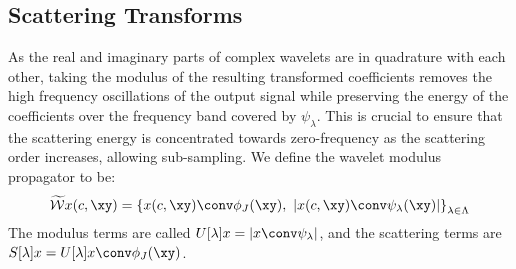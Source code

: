 \subsection{Scattering Transforms}\label{sec:ch5:scatter}
As the real and imaginary parts of complex wavelets are in quadrature with
each other, taking the modulus of the resulting transformed coefficients removes
the high frequency oscillations of the output signal while preserving the energy
of the coefficients over the frequency band covered by $\psi_\lambda$. This is
crucial to ensure that the scattering energy is concentrated towards
zero-frequency as the scattering order increases, allowing sub-sampling.
We define the wavelet modulus propagator to be:
%
\begin{equation}
  \label{eq:ch5:wave_mod}
\widetilde{\mathcal{W}}x(c, \xy) = \left\{ x(c, \xy) \conv \phi_{J}(\xy),\ |x(c, \xy) \conv \psi_\lambda (\xy) | \right\}_{\lambda \in \Lambda} 
\end{equation}
The modulus terms are called $U[\lambda] x = \lvert x \conv \psi_\lambda \rvert$, and the scattering terms
are $S[\lambda] x = U[\lambda]x \conv \phi_J (\xy)$.
